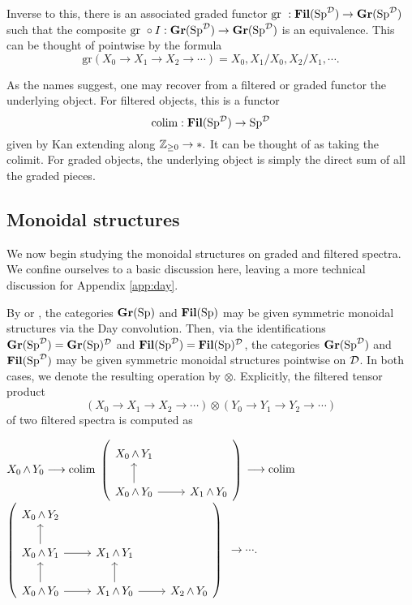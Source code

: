 Inverse to this, there is an associated graded functor $\text{gr }: \operatorname{\textbf{Fil}}(\operatorname{\text{Sp}}^{\operatorname{\mathcal{D}}}) \to \operatorname{\textbf{Gr}}(\operatorname{\text{Sp}}^{\operatorname{\mathcal{D}}})$ such that the composite $\text{gr }\circ I : \operatorname{\textbf{Gr}}(\operatorname{\text{Sp}}^{\operatorname{\mathcal{D}}}) \to \operatorname{\textbf{Gr}}(\operatorname{\text{Sp}}^{\operatorname{\mathcal{D}}})$ is an equivalence.   This can be thought of pointwise by the formula $$\text{gr}(X_0\to X_1\to X_2\to \cdots) = X_0, X_1/X_0, X_2/X_1, \cdots.$$

As the names suggest, one may recover from a filtered or graded functor the underlying object.  For filtered objects, this is a functor $$\operatorname*{\text{colim}} : \operatorname{\textbf{Fil}}(\operatorname{\text{Sp}}^{\operatorname{\mathcal{D}}}) \to \operatorname{\text{Sp}}^{\operatorname{\mathcal{D}}}$$ given by Kan extending along $\operatorname{\mathbb{Z}}_{\geq 0}\to *.$   It can be thought of as taking the colimit.  For graded objects, the underlying object is simply the direct sum of all the graded pieces.  



\subsection{Monoidal structures}\label{sect:monoidal}
We now begin studying the monoidal structures on graded and filtered spectra.  We confine ourselves to a basic discussion here, leaving a more technical discussion for Appendix \ref{app:day}.

By \cite{Glasman} or \cite[Example 2.2.6.17]{HA}, the categories $\operatorname{\textbf{Gr}}(\operatorname{\text{Sp}})$ and $\operatorname{\textbf{Fil}}(\operatorname{\text{Sp}})$ may be given symmetric monoidal structures via the Day convolution.  Then, via the identifications $\operatorname{\textbf{Gr}}(\operatorname{\text{Sp}}^{\operatorname{\mathcal{D}}}) = \operatorname{\textbf{Gr}}(\operatorname{\text{Sp}})^{\operatorname{\mathcal{D}}}$ and $\operatorname{\textbf{Fil}}(\operatorname{\text{Sp}}^{\operatorname{\mathcal{D}}}) = \operatorname{\textbf{Fil}}(\operatorname{\text{Sp}})^{\operatorname{\mathcal{D}}}$, the categories $\operatorname{\textbf{Gr}}(\operatorname{\text{Sp}}^{\operatorname{\mathcal{D}}})$ and $\operatorname{\textbf{Fil}}(\operatorname{\text{Sp}}^{\operatorname{\mathcal{D}}})$ may be given symmetric monoidal structures pointwise on $\operatorname{\mathcal{D}}$.  In both cases, we denote the resulting operation by $\otimes$. Explicitly, the filtered tensor product $$\left(X_0 \longrightarrow X_1 \longrightarrow X_2 \longrightarrow \cdots \right) \otimes \left(Y_0 \longrightarrow Y_1 \longrightarrow Y_2 \longrightarrow \cdots \right)$$
of two filtered spectra is computed as

\begin{center}
$X_0 \operatorname{\wedge} Y_0 \longrightarrow \operatorname*{\text{colim}} $
{$ \left(\begin{tikzcd} X_0 \smsh Y_1 \\  X_0 \smsh Y_0 \arrow{u} \arrow{r} & X_1 \smsh Y_0 \end{tikzcd} \right) $} 
$\longrightarrow \operatorname*{\text{colim}}$
 {$ \left( \begin{tikzcd} X_0 \smsh Y_2 \\ X_0 \smsh Y_1 \arrow{r} \arrow{u} & X_1 \smsh Y_1  \\ X_0 \smsh Y_0 \arrow{r} \arrow{u} & X_1 \smsh Y_0 \arrow{u} \arrow{r} & X_2 \smsh Y_0 \end{tikzcd} \right) $}
$\longrightarrow \cdots.$
\end{center}

